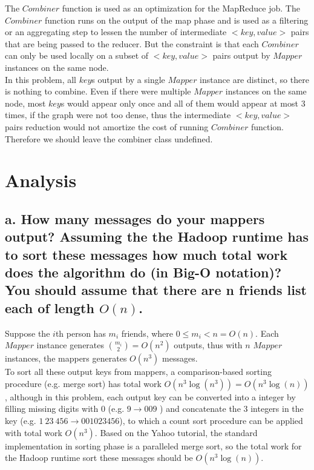 \documentclass[11 pt, a4paper]{article}  %
\begin{document}
The $Combiner$ function is used as an optimization for the MapReduce job. The $Combiner$ function runs on the output of the map phase and is used as a filtering or an aggregating step to lessen the number of intermediate $<key, value>$ pairs that are being passed to the reducer. But the constraint is that each $Combiner$ can only be used locally on a subset of $<key, value>$ pairs output by $Mapper$ instances on the same node. \\

In this problem,  all $key$s output by a single $Mapper$ instance are distinct, so there is nothing to combine. Even if there were multiple $Mapper$ instances on the same node, most $key$s would appear only once and all of them would appear at most $3$ times, if the graph were not too dense, thus the intermediate $<key, value>$ pairs reduction would not amortize the cost of running $Combiner$ function. Therefore we should leave the combiner class undefined.


\section{Analysis}
\subsection*{a. How many messages do your mappers output? Assuming the the Hadoop runtime has to sort these messages how much total work does the algorithm do (in Big-O notation)? You should assume that there are n friends list each of length $O(n)$.}

Suppose the $i$th person has $m_i$ friends, where $0 \leq m_i < n = O(n)$. Each $Mapper$ instance generates ${m_i \choose 2}=O(n^2)$ outputs, thus with $n$ $Mapper$ instances, the mappers generates $O(n^3)$ messages.\\

To sort all these output keys from mappers, a comparison-based sorting procedure (e.g. merge sort) has total work $O(n^3\log(n^3)) = O(n^3\log(n))$, although in this problem, each output key can be converted into a integer by filling missing digits with $0$ (e.g. $9 \rightarrow 009$ ) and concatenate the $3$ integers in the key (e.g. $1\ 23\ 456  \rightarrow 001023456 $), to which a count sort procedure can be applied with total work $O(n^3)$. Based on the Yahoo tutorial, the standard implementation in sorting phase is a paralleled merge sort, so the total work for the Hadoop runtime sort these messages should be $O(n^3\log(n))$.
\end{document}
